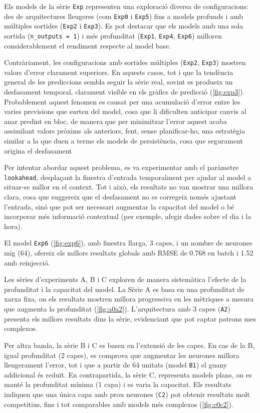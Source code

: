 \documentclass[../main.tex]{subfiles}
\begin{document}
Els models de la sèrie \texttt{Exp} representen una exploració diversa de configuracions: des de arquitectures lleugeres (com \texttt{Exp0} i \texttt{Exp5}) fins a models profunds i amb múltiples sortides (\texttt{Exp2} i \texttt{Exp3}). Es pot destacar que els models amb una sola sortida (\texttt{n\_outputs = 1}) i més profunditat (\texttt{Exp1}, \texttt{Exp4}, \texttt{Exp6}) milloren considerablement el rendiment respecte al model base. 

Contràriament, les configuracions amb sortides múltiples (\texttt{Exp2}, \texttt{Exp3}) mostren valors d’error clarament superiors. En aquests casos, tot i que la tendència general de les prediccions sembla seguir la sèrie real, sovint es produeix un desfasament temporal, clarament visible en els gràfics de predicció (\cref{fig:exp3}). Probablement aquest fenomen es causat per una acumulació d'error entre les varies previsions que surten del model, cosa que li dificulten anticipar canvis al anar predint en bloc, de manera que per minimitzar l'error aquest acaba assimilant valors pròxims als anteriors, fent, sense planificar-ho, una estratègia similar a la que duen a terme els models de persistència, cosa que segurament origina el desfasament

Per intentar abordar aquest problema, es va experimentar amb el paràmetre \texttt{lookahead}, desplaçant la finestra d’entrada temporalment per ajudar al model a situar-se millor en el context. Tot i això, els resultats no van mostrar una millora clara, cosa que suggereix que el desfasament no es corregeix només ajustant l’entrada, sinó que pot ser necessari augmentar la capacitat del model o bé incorporar més informació contextual (per exemple, afegir dades sobre el dia i la hora).

El model \texttt{Exp6} (\cref{fig:exp6}), amb finestra llarga, 3 capes, i un nombre de neurones mig (64), ofereix els millors resultats globals amb RMSE de 0.768 en batch i 1.52 amb reinjecció.

Les sèries d’experiments A, B i C exploren de manera sistemàtica l’efecte de la profunditat i la capacitat del model. La Sèrie A es basa en una profunditat de xarxa fixa, on els resultats mostren millora progressiva en les mètriques a mesura que augmenta la profunditat (\cref{fig:a0a2}). L’arquitectura amb 3 capes (\texttt{A2}) presenta els millors resultats dins la sèrie, evidenciant que pot captar patrons mes complexos.
    
Per altra banda, la sèrie B i C es basen en l'extensió de les capes. En cas de la B, igual profunditat (2 capes), es comprova que augmentar les neurones millora lleugerament l’error, tot i que a partir de 64 unitats (model \texttt{B1}) el guany addicional és reduït. En contrapartida, la sèrie C, representa models plans, on es manté la profunditat mínima (1 capa) i es varia la capacitat. Els resultats indiquen que una única capa amb prou neurones (\texttt{C2}) pot obtenir resultats molt competitius, fins i tot comparables amb models més complexos (\cref{fig:c0c2}).
\end{document}
